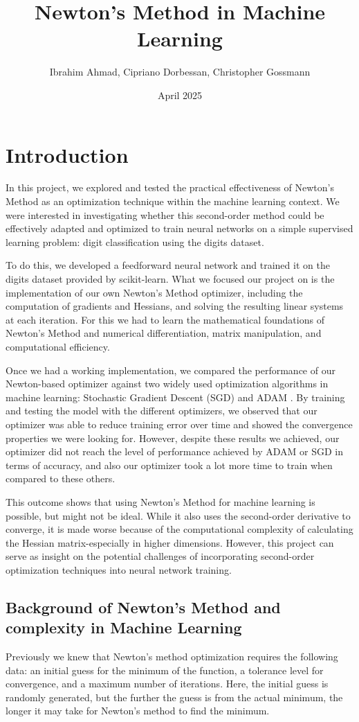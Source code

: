 \documentclass[10pt]{article}
\title{Newton's Method in Machine Learning }
\author{Ibrahim Ahmad, Cipriano Dorbessan, Christopher Gossmann}
\date{April 2025}
\begin{document}
\maketitle
\section{Introduction}
In this project, we explored and tested the practical effectiveness of Newton's Method as an optimization technique within the machine learning context. We were interested in investigating whether this second-order method could be effectively adapted and optimized to train neural networks on a simple supervised learning problem: digit classification using the digits dataset.

To do this, we developed a feedforward neural network and trained it on the digits dataset provided by scikit-learn. What we focused our project on is the implementation of our own Newton's Method optimizer, including the computation of gradients and Hessians, and solving the resulting linear systems at each iteration. For this we had to learn the mathematical foundations of Newton's Method and numerical differentiation, matrix manipulation, and computational efficiency.

Once we had a working implementation, we compared the performance of our Newton-based optimizer against two widely used optimization algorithms in machine learning: Stochastic Gradient Descent (SGD)\cite{contributors-2020-stochastic} and ADAM \cite{kingma2017adammethodstochasticoptimization}. By training and testing the model with the different optimizers, we observed that our optimizer was able to reduce training error over time and showed the convergence properties we were looking for. However, despite these results we achieved, our optimizer did not reach the level of performance achieved by ADAM or SGD in terms of accuracy, and also our optimizer took a lot more time to train when compared to these others.

This outcome shows that using Newton's Method for machine learning is possible, but might not be ideal. While it also uses the second-order derivative to converge, it is made worse because of the computational complexity of calculating the Hessian matrix-especially in higher dimensions. However, this project can serve as insight on the potential challenges of incorporating second-order optimization techniques into neural network training.
\newpage
\subsection{Background of Newton's Method and complexity in Machine Learning}
Previously we knew that Newton’s method optimization requires the following data: an initial guess for the minimum of the function, a tolerance level for convergence, and a maximum number of iterations. Here, the initial guess is randomly generated, but the further the guess is from the actual minimum, the longer it may take for Newton’s method to find the minimum.
\end{document}
